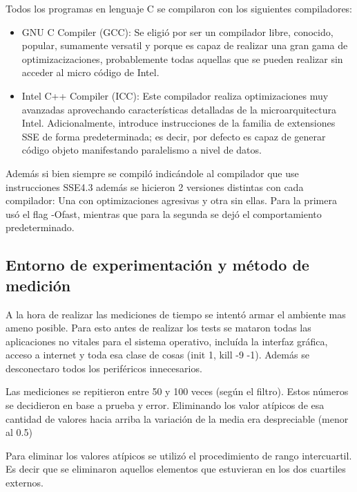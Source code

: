 Todos los programas en lenguaje C se compilaron con los siguientes compiladores:

\begin{itemize}
	\item GNU C Compiler (GCC): Se eligió por ser un compilador libre, conocido, popular, sumamente versatil y porque es capaz de realizar una gran gama de optimizacizaciones, probablemente todas aquellas que se pueden realizar sin acceder al micro código de Intel.

	\item Intel C++ Compiler (ICC): Este compilador realiza optimizaciones muy avanzadas aprovechando características detalladas de la microarquitectura Intel. Adicionalmente, introduce instrucciones de la familia de extensiones SSE de forma predeterminada; es decir, por defecto es capaz de generar código objeto manifestando paralelismo a nivel de datos.
\end{itemize} 
				
Además si bien siempre se compiló indicándole al compilador que use instrucciones SSE4.3 además se hicieron 2 versiones distintas con cada compilador: Una con optimizaciones agresivas y otra sin ellas. Para la primera usó el flag -Ofast, mientras que para la segunda se dejó el comportamiento predeterminado.


\subsection{Entorno de experimentación y método de medición}

	A la hora de realizar las mediciones de tiempo se intentó armar el ambiente mas
ameno posible. Para esto antes de realizar los tests se mataron todas las aplicaciones
no vitales para el sistema operativo, incluída la interfaz gráfica, acceso a internet y
toda esa clase de cosas (init 1, kill -9 -1). Además se desconectaro todos los periféricos
innecesarios.

	Las mediciones se repitieron entre 50 y 100 veces (según el filtro). Estos números se
decidieron en base a prueba y error. Eliminando los valor atípicos de esa cantidad
de valores hacia arriba la variación de la media era despreciable (menor al 0.5)

	Para eliminar los valores atípicos se utilizó el procedimiento de rango intercuartil. Es decir
que se eliminaron aquellos elementos que estuvieran en los dos cuartiles externos.


